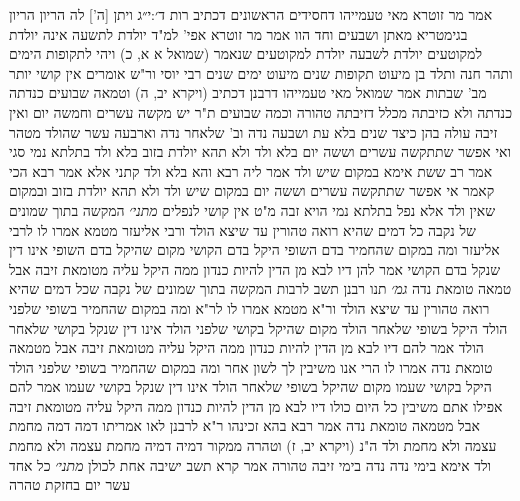 \documentclass[12pt, openany]{book}
\begin{document}
{אמר מר זוטרא  מאי טעמייהו דחסידים הראשונים דכתיב {רות ד׳:י״ג } ויתן [ה'] לה הריון הריון בגימטריא מאתן ושבעים וחד הוו 
אמר מר זוטרא  אפי' למ"ד יולדת לתשעה אינה יולדת למקוטעים יולדת לשבעה יולדת למקוטעים שנאמר (שמואל א א, כ) ויהי לתקופות הימים ותהר חנה ותלד בן מיעוט תקופות שנים מיעוט ימים שנים
רבי יוסי ור"ש אומרים אין קושי יותר מב' שבתות אמר שמואל  מאי טעמייהו דרבנן דכתיב (ויקרא יב, ה) וטמאה שבועים כנדתה כנדתה ולא כזיבתה מכלל דזיבתה טהורה וכמה שבועים 
ת"ר  יש מקשה עשרים וחמשה יום ואין זיבה עולה בהן  כיצד שנים בלא עת ושבעה נדה וב' שלאחר נדה וארבעה עשר שהולד מטהר 
ואי אפשר שתתקשה עשרים וששה יום בלא ולד ולא תהא יולדת בזוב 
בלא ולד  בתלתא נמי סגי  אמר רב ששת אימא  במקום שיש ולד  אמר ליה רבא  והא בלא ולד קתני 
אלא אמר רבא הכי קאמר  אי אפשר שתתקשה עשרים וששה יום במקום שיש ולד ולא תהא יולדת בזוב ובמקום שאין ולד אלא נפל בתלתא נמי הויא זבה מ"ט אין קושי לנפלים
{\large\emph{מתני׳}} המקשה בתוך שמונים של נקבה כל דמים שהיא רואה טהורין עד שיצא הולד ורבי אליעזר מטמא
אמרו לו לרבי אליעזר  ומה במקום שהחמיר בדם השופי היקל בדם הקושי מקום שהיקל בדם השופי אינו דין שנקל בדם הקושי 
אמר להן  דיו לבא מן הדין להיות כנדון ממה היקל עליה מטומאת זיבה אבל טמאה טומאת נדה
{\large\emph{גמ׳}} תנו רבנן תשב לרבות המקשה בתוך שמונים של נקבה שכל דמים שהיא רואה טהורין עד שיצא הולד  ור"א מטמא 
אמרו לו לר"א  ומה במקום שהחמיר בשופי שלפני הולד היקל בשופי שלאחר הולד  מקום שהיקל בקושי שלפני הולד אינו דין שנקל בקושי שלאחר הולד 
אמר להם  דיו לבא מן הדין להיות כנדון ממה היקל עליה מטומאת זיבה אבל מטמאה טומאת נדה 
אמרו לו  הרי אנו משיבין לך לשון אחר ומה במקום שהחמיר בשופי שלפני הולד היקל בקושי שעמו  מקום שהיקל בשופי שלאחר הולד אינו דין שנקל בקושי שעמו 
אמר להם  אפילו אתם משיבין כל היום כולו דיו לבא מן הדין להיות כנדון ממה היקל עליה מטומאת זיבה אבל מטמאה טומאת נדה 
אמר רבא  בהא זכינהו ר"א לרבנן לאו אמריתו דמה דמה מחמת עצמה ולא מחמת ולד ה"נ (ויקרא יב, ז) וטהרה ממקור דמיה דמיה מחמת עצמה ולא מחמת ולד 
אימא  בימי נדה נדה בימי זיבה טהורה  אמר קרא  תשב ישיבה אחת לכולן
{\large\emph{מתני׳}} כל אחד עשר יום בחזקת טהרה}
\end{document}
